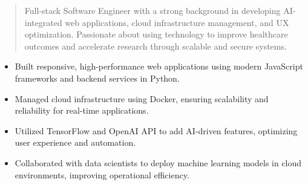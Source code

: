 



\makecvheader

\begin{quote}
  \noindent
  Full-stack Software Engineer with a strong background in developing AI-integrated web applications, cloud infrastructure management, and UX optimization. Passionate about using technology to improve healthcare outcomes and accelerate research through scalable and secure systems.
\end{quote}

\par\smallskip
\noindent
\begin{minipage}{20cm}
  \begin{minipage}{9.75cm}
    \begin{itemize}
      \item Built responsive, high-performance web applications using modern JavaScript frameworks and backend services in Python.
      \item Managed cloud infrastructure using Docker, ensuring scalability and reliability for real-time applications.
    \end{itemize}
  \end{minipage}
  \hfill
  \begin{minipage}{9.75cm}
    \begin{itemize}
      \item Utilized TensorFlow and OpenAI API to add AI-driven features, optimizing user experience and automation.
      \item Collaborated with data scientists to deploy machine learning models in cloud environments, improving operational efficiency.
    \end{itemize}
  \end{minipage}
\end{minipage}
\par\smallskip
\divider

